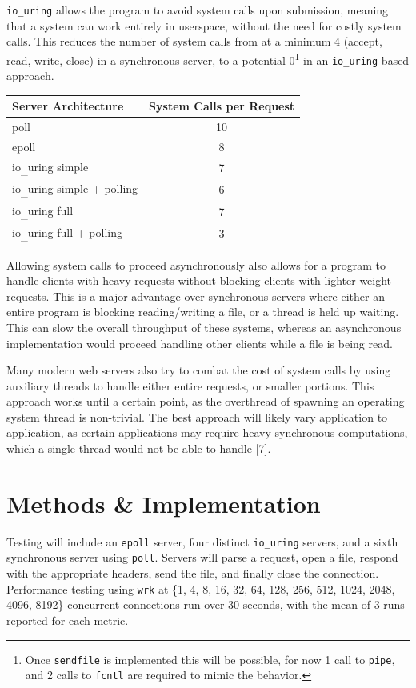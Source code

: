 \documentclass[letterpaper, 10pt, twocolumn]{article}
\makeatletter
\newcommand{\cslcitation}[2]
 {\protect\hyper@linkstart{cite}{citeproc_bib_item_#1}#2\hyper@linkend}
\makeatother
\begin{document}
\texttt{io\_uring} allows the program to avoid system calls upon submission, meaning that a system can work entirely in userspace, without the need for costly system calls. This reduces the number of system calls from at a minimum 4 (accept, read, write, close) in a synchronous server, to a potential 0\footnote{Once \texttt{sendfile} is implemented this will be possible, for now 1 call to \texttt{pipe}, and 2 calls to \texttt{fcntl} are required to mimic the behavior.} in an \texttt{io\_uring} based approach.

\begin{center}
\begin{tabular}{|l|c|}
Server Architecture & System Calls per Request\\
\hline
poll & 10\\
epoll & 8\\
io\textsubscript{\_}uring simple & 7\\
io\textsubscript{\_}uring simple + polling & 6\\
io\textsubscript{\_}uring full & 7\\
io\textsubscript{\_}uring full + polling & 3\\
\end{tabular}
\end{center}

Allowing system calls to proceed asynchronously also allows for a program to handle clients with heavy requests without blocking clients with lighter weight requests. This is a major advantage over synchronous servers where either an entire program is blocking reading/writing a file, or a thread is held up waiting. This can slow the overall throughput of these systems, whereas an asynchronous implementation would proceed handling other clients while a file is being read.

Many modern web servers also try to combat the cost of system calls by using auxiliary threads to handle either entire requests, or smaller portions. This approach works until a certain point, as the overthread of spawning an operating system thread is non-trivial. The best approach will likely vary application to application, as certain applications may require heavy synchronous computations, which a single thread would not be able to handle \cslcitation{7}{[7]}.
\section{Methods \& Implementation}
\label{sec:org3c8d9b3}
Testing will include an \texttt{epoll} server, four distinct \texttt{io\_uring} servers, and a sixth synchronous server using \texttt{poll}. Servers will parse a request, open a file, respond with the appropriate headers, send the file, and finally close the connection. Performance testing using \texttt{wrk} at \{1, 4, 8, 16, 32, 64, 128, 256, 512, 1024, 2048, 4096, 8192\} concurrent connections run over 30 seconds, with the mean of 3 runs reported for each metric.
\end{document}
